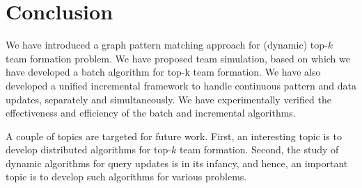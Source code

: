 \section{Conclusion}
\label{sec-conclusion}

We have introduced a graph pattern matching approach for (dynamic) top-$k$ team formation problem.
We have proposed team simulation,
based on which we have developed a batch algorithm for top-k team formation.
We have also  developed a unified incremental framework to handle continuous pattern and data updates, separately and simultaneously.
We have experimentally verified the effectiveness and efficiency of the batch and incremental algorithms.

A couple of topics are targeted for future work.  First, an interesting topic is to develop distributed algorithms for top-$k$ team formation.
Second, the study of dynamic algorithms for query updates is in its infancy,
and hence, an important topic is to develop such algorithms for various problems.

